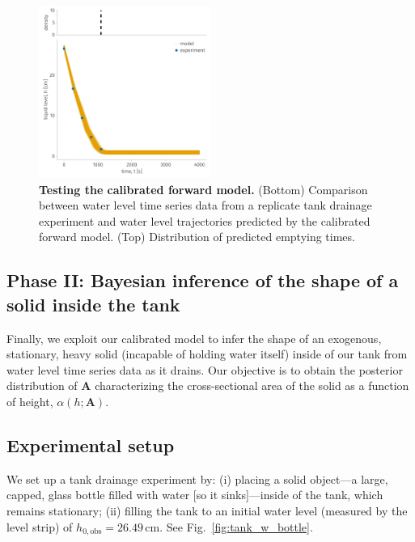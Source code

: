 \documentclass[openacc]{rsproca_new}%
\begin{document}
\begin{figure}[h!]
    \centering
    	\includegraphics[width=0.5\textwidth]{test.pdf}
    \caption{
      \textbf{Testing the calibrated forward model.}
      (Bottom) Comparison between water level time series data from a replicate tank drainage experiment and water level trajectories predicted by the calibrated forward model. 
      (Top) Distribution of predicted emptying times.
      } \label{fig:test}
\end{figure}

\subsection{Phase II: Bayesian inference of the shape of a solid inside the tank} \label{sec:phaseII}
Finally, we exploit our calibrated model to infer the shape of an exogenous, stationary, heavy solid (incapable of holding water itself) inside of our tank from water level time series data as it drains.
Our objective is to obtain the posterior distribution of $\mathbf{A}$ characterizing the cross-sectional area of the solid as a function of height, $\alpha(h; \mathbf{A})$.

\subsection{Experimental setup}
We set up a tank drainage experiment by:
(i) placing a solid object---a large, capped, glass bottle filled with water [so it sinks]---inside of the tank, which remains stationary;
(ii) filling the tank to an initial water level (measured by the level strip) of $h_{0, \text{obs}}=26.49$\,cm. 
See Fig.~\ref{fig:tank_w_bottle}.
\end{document}
